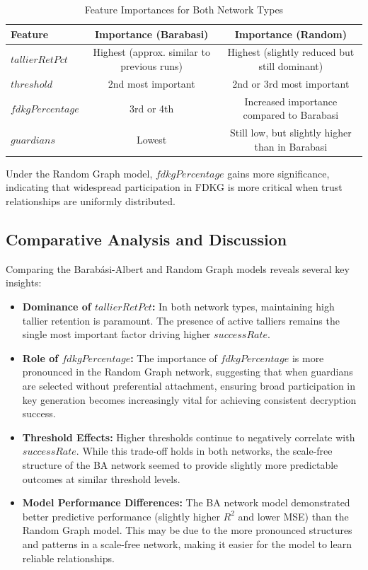 \documentclass[runningheads]{llncs}
\begin{document}
\begin{table}[h]
\centering
\caption{Feature Importances for Both Network Types}
\label{tab:feature_importances_networks}
\begin{tabular}{lcc}
\toprule
\textbf{Feature} & \textbf{Importance (Barabasi)} & \textbf{Importance (Random)} \\
\midrule
$tallierRetPct$ & Highest (approx. similar to previous runs) & Highest (slightly reduced but still dominant) \\
$threshold$     & 2nd most important                         & 2nd or 3rd most important \\
$fdkgPercentage$& 3rd or 4th                                  & Increased importance compared to Barabasi \\
$guardians$     & Lowest                                      & Still low, but slightly higher than in Barabasi \\
\bottomrule
\end{tabular}
\end{table}

\noindent Under the Random Graph model, $fdkgPercentage$ gains more significance, indicating that widespread participation in FDKG is more critical when trust relationships are uniformly distributed.

\subsection{Comparative Analysis and Discussion}

Comparing the Barabási-Albert and Random Graph models reveals several key insights:

\begin{itemize}
    \item \textbf{Dominance of $tallierRetPct$:} In both network types, maintaining high tallier retention is paramount. The presence of active talliers remains the single most important factor driving higher $successRate$.
    
    \item \textbf{Role of $fdkgPercentage$:} The importance of $fdkgPercentage$ is more pronounced in the Random Graph network, suggesting that when guardians are selected without preferential attachment, ensuring broad participation in key generation becomes increasingly vital for achieving consistent decryption success.
    
    \item \textbf{Threshold Effects:} Higher thresholds continue to negatively correlate with $successRate$. While this trade-off holds in both networks, the scale-free structure of the BA network seemed to provide slightly more predictable outcomes at similar threshold levels.
    
    \item \textbf{Model Performance Differences:} The BA network model demonstrated better predictive performance (slightly higher $R^2$ and lower MSE) than the Random Graph model. This may be due to the more pronounced structures and patterns in a scale-free network, making it easier for the model to learn reliable relationships.
\end{itemize}
\end{document}
